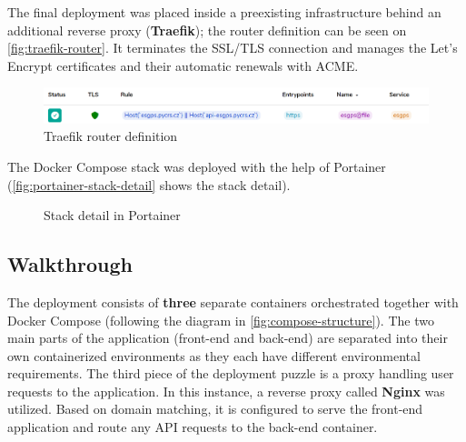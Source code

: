 \documentclass[FM,BP,EN,fonts]{tulthesis}
\begin{document}
The final deployment was placed inside a preexisting infrastructure behind an additional reverse proxy (\textbf{Traefik}); the router definition can be seen on \autoref{fig:traefik-router}. It terminates the SSL/TLS connection and manages the Let's Encrypt certificates and their automatic renewals with ACME. 

\begin{figure}[ht]
    \centering
    \includegraphics[scale=.65]{media/traefik-detail.png}
    \caption{Traefik router definition}
    \label{fig:traefik-router}
\end{figure}

The Docker Compose stack was deployed with the help of Portainer (\autoref{fig:portainer-stack-detail} shows the stack detail).

\begin{figure}[ht]
    \centering
    \caption{Stack detail in Portainer}
    \label{fig:portainer-stack-detail}
\end{figure}


\subsection{Walkthrough}
The deployment consists of \textbf{three} separate containers orchestrated together with Docker Compose (following the diagram in \autoref{fig:compose-structure}). The two main parts of the application (front-end and back-end) are separated into their own containerized environments as they each have different environmental requirements. The third piece of the deployment puzzle is a proxy handling user requests to the application. In this instance, a reverse proxy called \textbf{Nginx} was utilized. Based on domain matching, it is configured to serve the front-end application and route any API requests to the back-end container.
\end{document}
